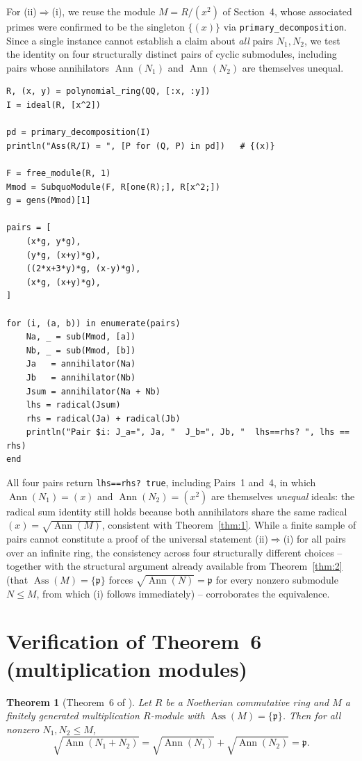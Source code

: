 \documentclass[11pt]{article}
\newtheorem{theorem}{Theorem}
\newcommand{\Ann}{\operatorname{Ann}}
\newcommand{\Ass}{\operatorname{Ass}}
\begin{document}
For (ii)$\Rightarrow$(i), we reuse the module $M=R/(x^2)$ of Section~4,
whose associated primes were confirmed to be the singleton $\{(x)\}$ via
\texttt{primary\_decomposition}. Since a single instance cannot establish
a claim about \emph{all} pairs $N_1,N_2$, we test the identity on four
structurally distinct pairs of cyclic submodules, including pairs whose
annihilators $\Ann(N_1)$ and $\Ann(N_2)$ are themselves unequal.

\begin{lstlisting}
R, (x, y) = polynomial_ring(QQ, [:x, :y])
I = ideal(R, [x^2])

pd = primary_decomposition(I)
println("Ass(R/I) = ", [P for (Q, P) in pd])   # {(x)}

F = free_module(R, 1)
Mmod = SubquoModule(F, R[one(R);], R[x^2;])
g = gens(Mmod)[1]

pairs = [
    (x*g, y*g),
    (y*g, (x+y)*g),
    ((2*x+3*y)*g, (x-y)*g),
    (x*g, (x+y)*g),
]

for (i, (a, b)) in enumerate(pairs)
    Na, _ = sub(Mmod, [a])
    Nb, _ = sub(Mmod, [b])
    Ja   = annihilator(Na)
    Jb   = annihilator(Nb)
    Jsum = annihilator(Na + Nb)
    lhs = radical(Jsum)
    rhs = radical(Ja) + radical(Jb)
    println("Pair $i: J_a=", Ja, "  J_b=", Jb, "  lhs==rhs? ", lhs == rhs)
end
\end{lstlisting}

All four pairs return \texttt{lhs==rhs? true}, including Pairs~1 and~4,
in which $\Ann(N_1)=(x)$ and $\Ann(N_2)=(x^2)$ are themselves
\emph{unequal} ideals: the radical sum identity still holds because both
annihilators share the same radical $(x)=\sqrt{\Ann(M)}$, consistent with
Theorem~\ref{thm:1}. While a finite sample of pairs cannot constitute a
proof of the universal statement (ii)$\Rightarrow$(i) for all pairs over
an infinite ring, the consistency across four structurally different
choices -- together with the structural argument already available from
Theorem~\ref{thm:2} (that $\Ass(M)=\{\mathfrak p\}$ forces
$\sqrt{\Ann(N)}=\mathfrak p$ for every nonzero submodule $N\le M$, from
which (i) follows immediately) -- corroborates the equivalence.

\section{Verification of Theorem~6 (multiplication modules)}

\begin{theorem}[Theorem~6 of \cite{pekin-ozkaya-2026}]
\label{thm:6}
Let $R$ be a Noetherian commutative ring and $M$ a finitely generated
multiplication $R$-module with $\Ass(M)=\{\mathfrak p\}$. Then for all
nonzero $N_1,N_2\le M$,
\[
  \sqrt{\Ann(N_1+N_2)} = \sqrt{\Ann(N_1)} + \sqrt{\Ann(N_2)} = \mathfrak p.
\]
\end{theorem}
\end{document}
